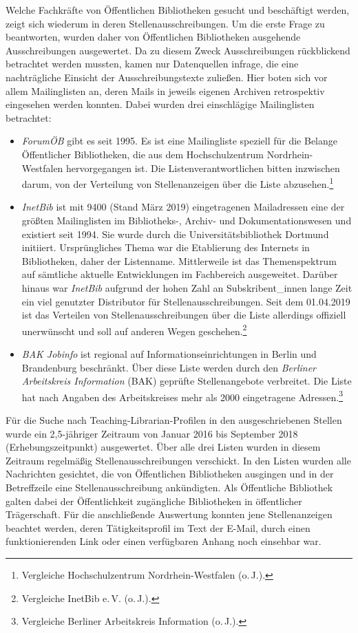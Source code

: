 \documentclass[a4paper,
fontsize=11pt,
oneside,
numbers=noperiodatend,
parskip=half-,
bibliography=totoc,
final
]{scrartcl}
\begin{document}
Welche Fachkräfte von Öffentlichen Bibliotheken gesucht und beschäftigt
werden, zeigt sich wiederum in deren Stellenausschreibungen. Um die
erste Frage zu beantworten, wurden daher von Öffentlichen Bibliotheken
ausgehende Ausschreibungen ausgewertet. Da zu diesem Zweck
Ausschreibungen rückblickend betrachtet werden mussten, kamen nur
Datenquellen infrage, die eine nachträgliche Einsicht der
Ausschreibungstexte zuließen. Hier boten sich vor allem Mailinglisten
an, deren Mails in jeweils eigenen Archiven retrospektiv eingesehen
werden konnten. Dabei wurden drei einschlägige Mailinglisten betrachtet:

\begin{itemize}
\item
  \emph{ForumÖB} gibt es seit 1995. Es ist eine Mailingliste speziell
  für die Belange Öffentlicher Bibliotheken, die aus dem
  Hochschulzentrum Nordrhein-Westfalen hervorgegangen ist. Die
  Listenverantwortlichen bitten inzwischen darum, von der Verteilung von
  Stellenanzeigen über die Liste abzusehen.\footnote{Vergleiche
    Hochschulzentrum Nordrhein-Westfalen (o.\,J.).}
\item
  \emph{InetBib} ist mit 9400 (Stand März 2019) eingetragenen
  Mailadressen eine der größten Mailinglisten im Bibliotheks-, Archiv-
  und Dokumentationswesen und existiert seit 1994. Sie wurde durch die
  Universitätsbibliothek Dortmund initiiert. Ursprüngliches Thema war
  die Etablierung des Internets in Bibliotheken, daher der Listenname.
  Mittlerweile ist das Themenspektrum auf sämtliche aktuelle
  Entwicklungen im Fachbereich ausgeweitet. Darüber hinaus war
  \emph{InetBib} aufgrund der hohen Zahl an Subskribent\_innen lange
  Zeit ein viel genutzter Distributor für Stellenausschreibungen. Seit
  dem 01.04.2019 ist das Verteilen von Stellenausschreibungen über die
  Liste allerdings offiziell unerwünscht und soll auf anderen Wegen
  geschehen.\footnote{Vergleiche InetBib e.\,V. (o.\,J.).}
\item
  \emph{BAK Jobinfo} ist regional auf Informationseinrichtungen in
  Berlin und Brandenburg beschränkt. Über diese Liste werden durch den
  \emph{Berliner Arbeitskreis Information} (BAK) geprüfte
  Stellenangebote verbreitet. Die Liste hat nach Angaben des
  Arbeitskreises mehr als 2000 eingetragene Adressen.\footnote{Vergleiche
    Berliner Arbeitskreis Information (o.\,J.).}
\end{itemize}

Für die Suche nach Teaching-Librarian-Profilen in den ausgeschriebenen
Stellen wurde ein 2,5-jähriger Zeitraum von Januar 2016 bis September
2018 (Erhebungszeitpunkt) ausgewertet. Über alle drei Listen wurden in
diesem Zeitraum regelmäßig Stellenausschreibungen verschickt. In den
Listen wurden alle Nachrichten gesichtet, die von Öffentlichen
Bibliotheken ausgingen und in der Betreffzeile eine Stellenausschreibung
ankündigten. Als Öffentliche Bibliothek galten dabei der Öffentlichkeit
zugängliche Bibliotheken in öffentlicher Trägerschaft. Für die
anschließende Auswertung konnten jene Stellenanzeigen beachtet werden,
deren Tätigkeitsprofil im Text der E-Mail, durch einen funktionierenden
Link oder einen verfügbaren Anhang noch einsehbar war.
\end{document}
